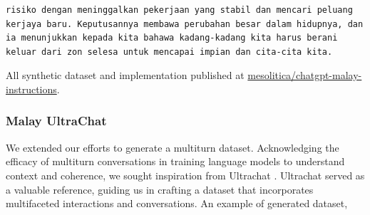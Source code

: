 \documentclass{article}
\begin{document}
\begin{lstlisting}[breaklines=true]
risiko dengan meninggalkan pekerjaan yang stabil dan mencari peluang kerjaya baru. Keputusannya membawa perubahan besar dalam hidupnya, dan ia menunjukkan kepada kita bahawa kadang-kadang kita harus berani keluar dari zon selesa untuk mencapai impian dan cita-cita kita.
\end{lstlisting}

All synthetic dataset and implementation published at \href{https://huggingface.co/datasets/mesolitica/chatgpt-malay-instructions}{mesolitica/chatgpt-malay-instructions}.

\subsubsection{Malay UltraChat}

We extended our efforts to generate a multiturn dataset. Acknowledging the efficacy of multiturn conversations in training language models to understand context and coherence, we sought inspiration from Ultrachat \cite{ding2023enhancing}. Ultrachat served as a valuable reference, guiding us in crafting a dataset that incorporates multifaceted interactions and conversations. An example of generated dataset,
\end{document}
